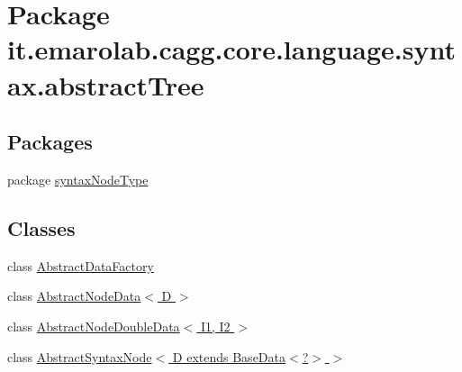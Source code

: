 \hypertarget{namespaceit_1_1emarolab_1_1cagg_1_1core_1_1language_1_1syntax_1_1abstractTree}{\section{Package it.\-emarolab.\-cagg.\-core.\-language.\-syntax.\-abstract\-Tree}
\label{namespaceit_1_1emarolab_1_1cagg_1_1core_1_1language_1_1syntax_1_1abstractTree}
}
\subsection*{Packages}
\begin{DoxyCompactItemize}
\item 
package \hyperlink{namespaceit_1_1emarolab_1_1cagg_1_1core_1_1language_1_1syntax_1_1abstractTree_1_1syntaxNodeType}{syntax\-Node\-Type}
\end{DoxyCompactItemize}
\subsection*{Classes}
\begin{DoxyCompactItemize}
\item 
class \hyperlink{classit_1_1emarolab_1_1cagg_1_1core_1_1language_1_1syntax_1_1abstractTree_1_1AbstractDataFactory}{Abstract\-Data\-Factory}
\item 
class \hyperlink{classit_1_1emarolab_1_1cagg_1_1core_1_1language_1_1syntax_1_1abstractTree_1_1AbstractNodeData_3_01D_01_4}{Abstract\-Node\-Data$<$ D $>$}
\item 
class \hyperlink{classit_1_1emarolab_1_1cagg_1_1core_1_1language_1_1syntax_1_1abstractTree_1_1AbstractNodeDoubleData_3_01I1_00_01I2_01_4}{Abstract\-Node\-Double\-Data$<$ I1, I2 $>$}
\item 
class \hyperlink{classit_1_1emarolab_1_1cagg_1_1core_1_1language_1_1syntax_1_1abstractTree_1_1AbstractSyntaxNode_366ce7377666ed8848a32408270165e9}{Abstract\-Syntax\-Node$<$ D extends Base\-Data$<$?$>$ $>$}
\end{DoxyCompactItemize}
